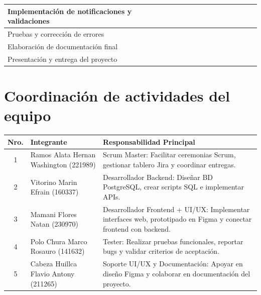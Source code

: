\begin{table}[H]
{\begin{tabular}{|p{5cm}|c|c|c|c|c|c|c|c|c|c|c|c|}
        Implementación de notificaciones y validaciones
        & & & & & & & & & \cellcolor{gray!40} & \cellcolor{gray!40} & & \\
        \hline

        Pruebas y corrección de errores
        & & & & & & & & & & \cellcolor{gray!40} & \cellcolor{gray!40} & \\
        \hline

        Elaboración de documentación final
        & & & & & & & & & & & \cellcolor{gray!40} & \\
        \hline

        Presentación y entrega del proyecto
        & & & & & & & & & & & \cellcolor{gray!40} & \cellcolor{gray!40} \\
        \hline

    \end{tabular}}
\end{table}

\vspace{0.8cm}

\section*{Coordinación de actividades del equipo}

\begin{center}
\begin{tabular}{|c|p{6cm}|p{5cm}|}
\hline
\textbf{Nro.} & \textbf{Integrante} & \textbf{Responsabilidad Principal} \\
\hline
1 & Ramos Alata Hernan Washington (221989) & Scrum Master: Facilitar ceremonias Scrum, gestionar tablero Jira y coordinar entregas. \\
\hline
2 & Vitorino Marin Efrain (160337) & Desarrollador Backend: Diseñar BD PostgreSQL, crear scripts SQL e implementar APIs. \\
\hline
3 & Mamani Flores Natan (230970) & Desarrollador Frontend + UI/UX: Implementar interfaces web, prototipado en Figma y conectar frontend con backend. \\
\hline
4 & Polo Chura Marco Rosauro (141632) & Tester: Realizar pruebas funcionales, reportar bugs y validar criterios de aceptación. \\
\hline
5 & Cabeza Huillca Flavio Antony (211265) & Soporte UI/UX y Documentación: Apoyar en diseño Figma y colaborar en documentación del proyecto. \\
\hline
\end{tabular}
\end{center}
